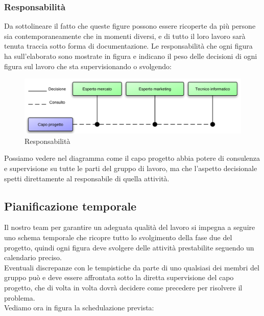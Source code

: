 \subsubsection{Responsabilità}
Da sottolineare il fatto che queste figure possono essere ricoperte da più persone sia contemporaneamente che in momenti diversi, e di tutto il loro lavoro sarà tenuta traccia sotto forma di documentazione.
Le responsabilità che ogni figura ha sull'elaborato sono mostrate in figura  e indicano il peso delle decisioni di ogni figura sul lavoro che sta supervisionando o svolgendo:

\vspace*{0.5cm}

\begin{figure}[H]
\centering
\includegraphics[scale=0.8]{images/resp.png}
\caption{Responsabilità}
\end{figure}

\vspace*{0.5cm}

Possiamo vedere nel diagramma  come il capo progetto abbia potere di consulenza e supervisione su tutte le parti del gruppo di lavoro, ma che l'aspetto decisionale spetti direttamente al responsabile di quella attività.

\newpage

\subsection{Pianificazione temporale}

Il nostro team per garantire un adeguata qualità del lavoro si impegna a seguire uno schema temporale che ricopre tutto lo svolgimento della fase due del progetto, quindi ogni figura deve svolgere delle attività prestabilite seguendo un calendario preciso. \\Eventuali discrepanze con le tempistiche da parte di uno qualsiasi dei membri del gruppo può e deve essere affrontata sotto la diretta supervisione del capo progetto, che di volta in volta dovrà decidere come precedere per risolvere il problema. \\Vediamo ora in figura  la schedulazione prevista:

